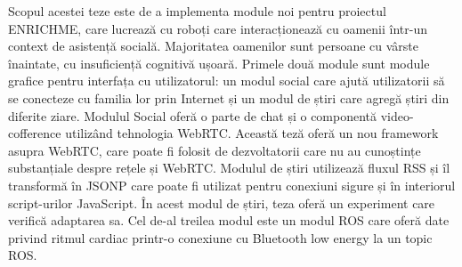\vspace*{7cm}
\begin{center}
Scopul acestei teze este de a implementa module noi pentru proiectul ENRICHME, care lucrează cu roboți care interacționează cu oamenii într-un context de asistență socială. Majoritatea oamenilor sunt persoane cu vârste înaintate, cu insuficiență cognitivă ușoară.
Primele două module sunt module grafice pentru interfața cu utilizatorul: un modul social care ajută utilizatorii să se conecteze cu familia lor prin Internet și un modul de știri care agregă știri din diferite ziare.
Modulul Social oferă o parte de chat și o componentă video-cofference utilizând tehnologia WebRTC.
Această teză oferă un nou framework asupra WebRTC, care poate fi folosit de dezvoltatorii care nu au cunoștințe substanțiale despre rețele și WebRTC.
Modulul de știri utilizează fluxul RSS și îl transformă în JSONP care poate fi utilizat pentru conexiuni sigure și în interiorul script-urilor JavaScript.
În acest modul de știri, teza oferă un experiment care verifică adaptarea sa.
Cel de-al treilea modul este un modul ROS care oferă date privind ritmul cardiac printr-o conexiune cu Bluetooth low energy la un topic ROS.
\end{center}
